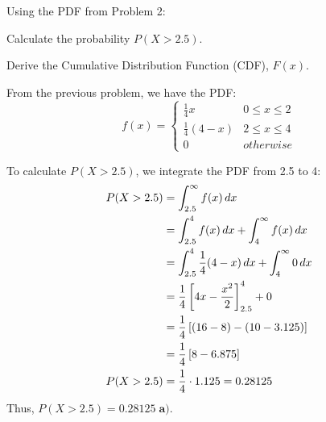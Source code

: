 \documentclass[a4paper, 10pt]{article}
\begin{document}
\begin{problem}
Using the PDF from Problem 2:
\begin{subproblems}
    \item Calculate the probability \( P(X > 2.5) \).
    \item Derive the Cumulative Distribution Function (CDF), \( F(x) \).
\end{subproblems}
\end{problem}

\begin{solution}
From the previous problem, we have the PDF:
\[
f(x) = \begin{cases}
    \tfrac{1}{4}x & 0 \leq x \le 2 \\
    \tfrac{1}{4}(4 - x) & 2 \leq x \leq 4 \\
    0 & otherwise
\end{cases}
\]

To calculate \( P(X > 2.5) \), we integrate the PDF from 2.5 to 4:
\begin{align*}
    P(X > 2.5) &= \int_{2.5}^{\infty} f(x)\,dx \\
    &= \int_{2.5}^{4} f(x)\,dx + \int_{4}^{\infty} f(x)\,dx \\
    &= \int_{2.5}^{4} \frac{1}{4}(4 - x)\,dx + \int_{4}^{\infty} 0\,dx \\
    &= \frac{1}{4} \left[4x - \frac{x^2}{2}\right]_{2.5}^{4} + 0 \\
    &= \frac{1}{4} \left[(16 - 8) - (10 - 3.125)\right] \\
    &= \frac{1}{4} \left[8 - 6.875\right] \\
    P(X > 2.5) &= \frac{1}{4} \cdot 1.125 = 0.28125
\end{align*}
Thus, \( P(X > 2.5) = \boxed{0.28125} \; \textbf{a).} \)

\vspace{4mm}


\end{solution}
\end{document}
